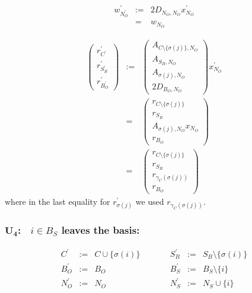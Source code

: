 \documentclass[a4paper]{article}
\begin{document}
\begin{eqnarray}
w_{N_{O}^{\prime}}^{\prime}
&:=&
2D_{N_{O}, N_{O}}x_{N_{O}}^{\prime}
\nonumber \\
&=&
w_{N_{O}}
\end{eqnarray}

\begin{eqnarray}
\left(
\begin{array}{c}
r_{C^{\prime}}^{\prime} \\
\hline
r_{S_{B}^{\prime}}^{\prime} \\
\hline
r_{B_{O}^{\prime}}^{\prime}
\end{array}
\right)
&:=&
\left(
\begin{array}{c}
A_{C \setminus \{\sigma(j)\}, N_{O}} \\
\hline
A_{S_{B}, N_{O}} \\
\hline
A_{\sigma(j), N_{O}} \\
\hline
2D_{B_{O}, N_{O}}
\end{array}
\right)
x_{N_{O}}^{\prime}
\nonumber \\
&=&
\left(
\begin{array}{c}
r_{C \setminus \{\sigma(j)\}} \\
\hline
r_{S_{B}} \\
\hline
A_{\sigma(j), N_{O}}x_{N_{O}} \\
\hline
r_{B_{O}}
\end{array}
\right)
\nonumber \\
&=&
\left(
\begin{array}{c}
r_{C \setminus \{\sigma(j)\}} \\
\hline
r_{S_{B}} \\
\hline
r_{\gamma_{C}(\sigma(j))} \\
\hline
r_{B_{O}}
\end{array}
\right)
\end{eqnarray}
where in the last equality for $r_{\sigma(j)}^{\prime}$ we used
$r_{\gamma_{C}(\sigma(j))}$.

\subsubsection{$\mathbf{U_{4}}$:$\quad i \in B_{S}$ leaves the basis:}
\begin{equation}
\label{update:slack_leaves_basis}
\begin{array}{ccccccc}
C^{\prime}      &:=&  C \cup \{\sigma(i)\}
&\quad\quad&
S_{B}^{\prime}  &:=&  S_{B} \setminus \{\sigma(i)\}  \\
B_{O}^{\prime}  &:=&  B_{O}
&\quad\quad&
B_{S}^{\prime}  &:=&  B_{S} \setminus \{i\}  \\
N_{O}^{\prime}  &:=&  N_{O}
&\quad\quad&
N_{S}^{\prime}  &:=&  N_{S} \cup \{i\} 
\end{array}
\end{equation}
\end{document}
